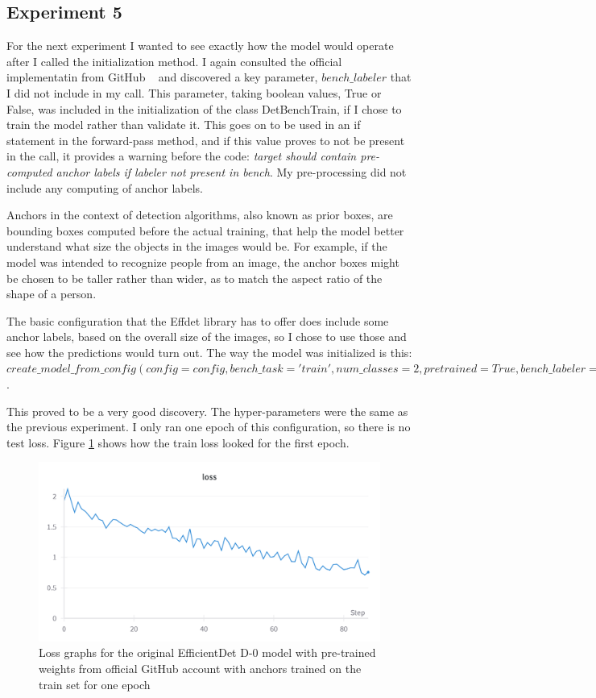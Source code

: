 \subsection{Experiment 5}

For the next experiment I wanted to see exactly how the model would operate after I called the initialization method. I again consulted the official implementatin from GitHub ~\cite{link7} and discovered a key parameter, \(bench\_labeler\) that I did not include in my call. This parameter, taking boolean values, True or False, was included in the initialization of the class DetBenchTrain, if I chose to train the model rather than validate it. This goes on to be used in an if statement in the forward-pass method, and if this value proves to not be present in the call, it provides a warning before the code: \textit{target should contain pre-computed anchor labels if labeler not present in bench}. My pre-processing did not include any computing of anchor labels.

Anchors in the context of detection algorithms, also known as prior boxes, are bounding boxes computed before the actual training, that help the model better understand what size the objects in the images would be. For example, if the model was intended to recognize people from an image, the anchor boxes might be chosen to be taller rather than wider, as to match the aspect ratio of the shape of a person.~\cite{link11}

The basic configuration that the Effdet library has to offer does include some anchor labels, based on the overall size of the images, so I chose to use those and see how the predictions would turn out. The way the model was initialized is this: \(create\_model\_from\_config(config=config, bench\_task='train', num\_classes=2, pretrained=True, bench\_labeler = True)\).

This proved to be a very good discovery. The hyper-parameters were the same as the previous experiment. I only ran one epoch of this configuration, so there is no test loss. Figure \ref{fig:fig34} shows how the train loss looked for the first epoch.

\begin{figure}[H]
    \centering
    \includegraphics[width=0.5\linewidth]{figures/Figure43.png}
    \caption{Loss graphs for the original EfficientDet D-0 model with pre-trained weights from official GitHub account with anchors trained on the train set for one epoch}
    \label{fig:fig34}
\end{figure}

